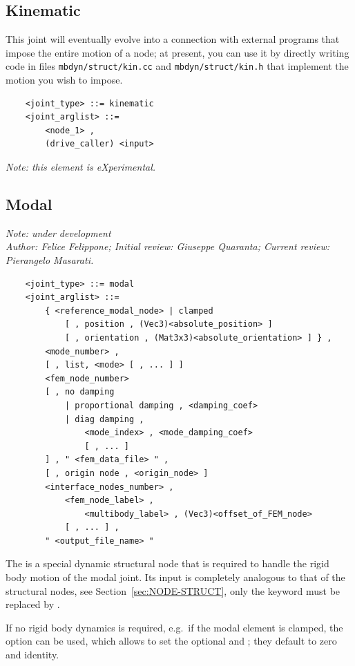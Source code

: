 \subsection{Kinematic}
This joint will eventually evolve into a connection with external programs
that impose the entire motion of a node; at present, you can use it
by directly writing code in files \verb;mbdyn/struct/kin.cc; and
\verb;mbdyn/struct/kin.h; that implement the motion you wish to impose.
\begin{verbatim}
    <joint_type> ::= kinematic
    <joint_arglist> ::= 
        <node_1> ,
        (drive_caller) <input>
\end{verbatim}
\emph{Note: this element is eXperimental.}
 
\subsection{Modal}\label{ELEMS-JOINT-MODAL}
\emph{Note: under development \\
    Author: Felice Felippone;
    Initial review: Giuseppe Quaranta;
    Current review: Pierangelo Masarati.}

\begin{verbatim}
    <joint_type> ::= modal
    <joint_arglist> ::=
        { <reference_modal_node> | clamped
            [ , position , (Vec3)<absolute_position> ]
            [ , orientation , (Mat3x3)<absolute_orientation> ] } ,
        <mode_number> ,
        [ , list, <mode> [ , ... ] ]
        <fem_node_number> 
        [ , no damping 
            | proportional damping , <damping_coef>
            | diag damping , 
                <mode_index> , <mode_damping_coef> 
                [ , ... ] 
        ] , " <fem_data_file> " ,
        [ , origin node , <origin_node> ]
        <interface_nodes_number> ,
            <fem_node_label> ,
                <multibody_label> , (Vec3)<offset_of_FEM_node>
            [ , ... ] ,
        " <output_file_name> "
\end{verbatim}
The  is a special dynamic structural node 
that is required to handle the rigid body motion of the modal joint.
Its input is completely analogous to that of the  structural
nodes, see Section~\ref{sec:NODE-STRUCT}, only the keyword  
must be replaced by .

\noindent
If no rigid body dynamics is required, e.g.\ if the modal element
is clamped, the  option can be used, which allows
to set the optional  
and ; they default to zero and identity.

